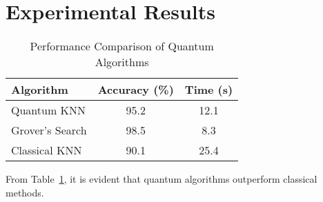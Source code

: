 \documentclass{article}
\begin{document}
\section*{Experimental Results}

\begin{table}[h!]
\centering
\caption{Performance Comparison of Quantum Algorithms}
\label{tab:results}
\begin{tabular}{lcc}
\toprule
\textbf{Algorithm} & \textbf{Accuracy (\%)} & \textbf{Time (s)} \\ 
\midrule
Quantum KNN & 95.2 & 12.1 \\ 
Grover's Search & 98.5 & 8.3 \\ 
Classical KNN & 90.1 & 25.4 \\ 
\bottomrule
\end{tabular}
\end{table}

From Table~\ref{tab:results}, it is evident that quantum algorithms outperform classical methods.
\end{document}
